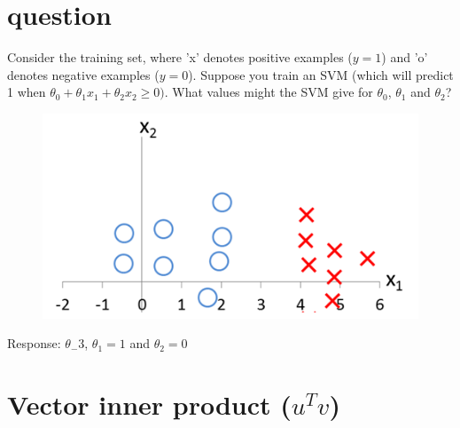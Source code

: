 \documentclass[a4paper,12pt]{report}
\begin{document}
\begin{appendices}
\section{question}
Consider the training set, where 'x' denotes positive examples ($y=1$) and 'o' denotes negative examples ($y=0$). Suppose you train an SVM (which will predict 1 when $\theta_0 + \theta_1 x_1 + \theta_2 x_2 \geq 0)$. What values might the SVM give for $\theta_0$, $\theta_1$ and $\theta_2$?
\begin{figure}[H]
	\centering
        \includegraphics[totalheight=4 cm]{question.png}\caption{}
\end{figure}

Response: $\theta_-3$, $\theta_1=1$ and $\theta_2=0$

\section{Vector inner product ($u^T v$)}


\end{appendices}
\end{document}
